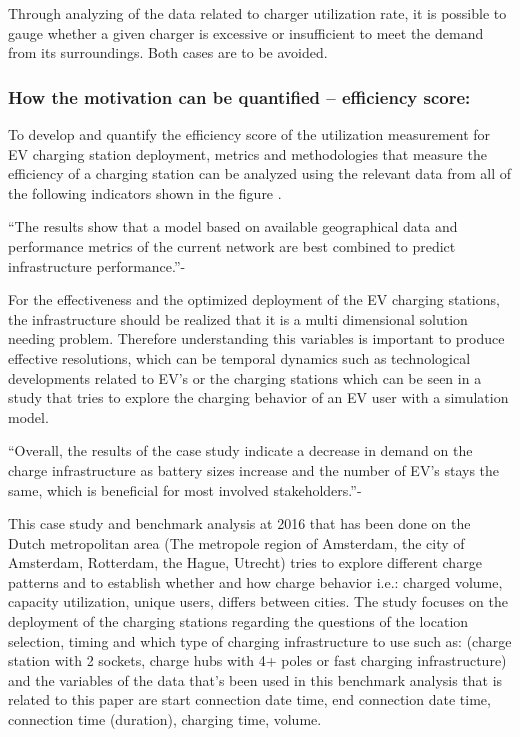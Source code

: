 Through analyzing of the data related to charger utilization rate, it is possible to gauge whether a given charger is excessive or insufficient to meet the demand from its surroundings. Both cases are to be avoided.

\subsubsection{How the motivation can be quantified – efficiency score:}\label{sec:43}

To develop and quantify the efficiency score of the utilization measurement for EV charging station deployment, metrics and methodologies that measure the efficiency of a charging station can be analyzed using the relevant data from all of the following indicators shown in the figure \cite{PLOS2024}.



“The results show that a model based on available geographical data and performance metrics of the current network are best combined to predict infrastructure performance.”-\cite{PLOS2024}

	For the effectiveness and the optimized deployment of the EV charging stations, the infrastructure should be realized that it is a multi dimensional solution needing problem. Therefore understanding this variables is important to produce effective resolutions, which can be temporal dynamics such as technological developments related to EV’s or the charging stations which can be seen in a study that tries to explore the charging behavior of an EV user with a simulation model.\cite{Vermeulen2018}

“Overall, the results of the case study indicate a decrease in demand on the charge infrastructure as battery sizes increase and the number of EV's stays the same, which is beneficial for most involved stakeholders.”-\cite{Vermeulen2018}

This case study and benchmark analysis \cite{Wolbertus2016} at 2016 that has been done on the Dutch metropolitan area (The metropole region of Amsterdam, the city of Amsterdam, Rotterdam, the Hague, Utrecht) tries to explore different charge patterns and to establish whether and how charge behavior i.e.: charged volume, capacity utilization, unique users, differs between cities. The study focuses on the deployment of the charging stations regarding the questions of the location selection, timing and which type of charging infrastructure to use such as: (charge station with 2 sockets, charge hubs with 4+ poles or fast charging infrastructure) and the variables of the data that’s been used in this benchmark analysis that is related to this paper are start connection date time, end connection date time, connection time (duration), charging time, volume.


